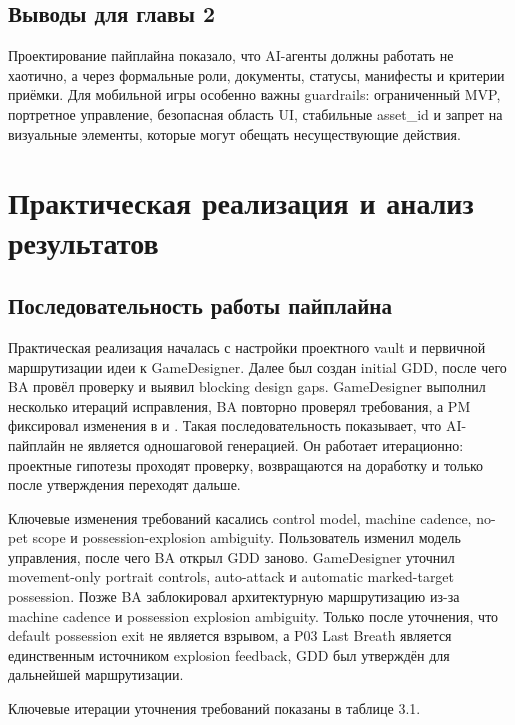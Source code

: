 \documentclass[a4paper,12pt]{report}
\newcommand{\file}[1]{\path{#1}}
\begin{document}
\section{Выводы для главы 2}

Проектирование пайплайна показало, что AI-агенты должны работать не хаотично, а через формальные роли, документы, статусы, манифесты и критерии приёмки. Для мобильной игры особенно важны guardrails: ограниченный MVP, портретное управление, безопасная область UI, стабильные asset\_id и запрет на визуальные элементы, которые могут обещать несуществующие действия.

\chapter{Практическая реализация и анализ результатов}

\section{Последовательность работы пайплайна}

Практическая реализация началась с настройки проектного vault и первичной маршрутизации идеи к GameDesigner. Далее был создан initial GDD, после чего BA провёл проверку и выявил blocking design gaps. GameDesigner выполнил несколько итераций исправления, BA повторно проверял требования, а PM фиксировал изменения в \file{STATUS.md} и \file{TASKS.md}. Такая последовательность показывает, что AI-пайплайн не является одношаговой генерацией. Он работает итерационно: проектные гипотезы проходят проверку, возвращаются на доработку и только после утверждения переходят дальше.

Ключевые изменения требований касались control model, machine cadence, no-pet scope и possession-explosion ambiguity. Пользователь изменил модель управления, после чего BA открыл GDD заново. GameDesigner уточнил movement-only portrait controls, auto-attack и automatic marked-target possession. Позже BA заблокировал архитектурную маршрутизацию из-за machine cadence и possession explosion ambiguity. Только после уточнения, что default possession exit не является взрывом, а P03 Last Breath является единственным источником explosion feedback, GDD был утверждён для дальнейшей маршрутизации.

Ключевые итерации уточнения требований показаны в таблице 3.1.
\end{document}
